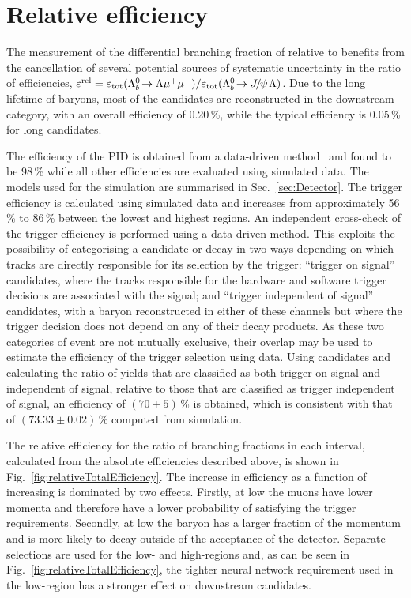  \section{Relative efficiency}
\label{sec:efficiency}

 The measurement of the differential branching fraction of
 \decay{\Lb}{\Lz\mumu} relative to \decay{\Lb}{\jpsi\Lz} benefits from
 the cancellation of several potential sources of systematic
 uncertainty in the ratio of efficiencies, $\varepsilon^{\rm
   rel}={\varepsilon_{\rm tot}}({{\Lambda}^0_{b}}\!\rightarrow {\ensuremath{\Lambda}}{\ensuremath{\mu^+\mu^-}})/{\varepsilon_{\rm tot}}({{\Lambda}^0_{b}}\!\rightarrow {\ensuremath{{J\mskip -3mu/\mskip -2mu\psi\mskip 2mu}}}{\ensuremath{\Lambda}})$.
 Due to the long lifetime of \Lz baryons, most of the candidates are
 reconstructed in the downstream category, with an overall efficiency
 of 0.20\,\%, while the typical efficiency is 0.05\,\% for long
 candidates.

 The efficiency of the PID is obtained from a data-driven
 method~\cite{LHCb-DP-2012-003} and found to be 98\,\% while all other
 efficiencies are evaluated using simulated data.  The models used for
 the simulation are summarised in Sec.~\ref{sec:Detector}.  The
 trigger efficiency is calculated using simulated data and increases
 from approximately 56\,\% to 86\,\% between the lowest and highest
 \qsq regions. An independent cross-check of the trigger efficiency is
 performed using a data-driven method.  This exploits the possibility
 of categorising a candidate \decay{\Lb}{\Lz\mumu} or
 \decay{\Lb}{\jpsi\Lz} decay in two ways depending on which tracks are
 directly responsible for its selection by the trigger: {``trigger on
   signal''} candidates, where the tracks responsible for the
 {hardware and software} trigger decisions are associated with the
 signal; and {``trigger independent of signal''} candidates, with a
 \Lb baryon reconstructed in either of these channels but where the
 trigger decision does not depend on any of their decay products.  As
 these two categories of event are not mutually exclusive, their
 overlap may be used to estimate the efficiency of the trigger
 selection using data.  Using \decay{\Lb}{\jpsi\Lz} candidates and
 calculating the ratio of yields that are classified as both trigger
 on signal and independent of signal, relative to those that are
 classified as trigger independent of signal, an efficiency of
 $(70\pm5)$\,\% is obtained, which is consistent with that of
 $(73.33\pm0.02)$\,\% computed from simulation.

 The relative efficiency for the ratio of branching fractions in each
 \qsq interval, calculated from the absolute efficiencies described
 above, is shown in Fig.~\ref{fig:relativeTotalEfficiency}.
 The increase in efficiency as a function of increasing \qsq is
 dominated by two effects. Firstly, at low \qsq the muons have lower
 momenta and therefore have a lower probability of satisfying the
 trigger requirements.  Secondly, at low \qsq the \Lz baryon has a
 larger fraction of the \Lb momentum and is more likely to decay
 outside of the acceptance of the detector. 
 Separate selections are used for the low- and high-\qsq regions and,
 as can be seen in Fig.~\ref{fig:relativeTotalEfficiency}, the tighter
 neural network requirement used in the low-\qsq region has
 a stronger effect on downstream candidates.
 
